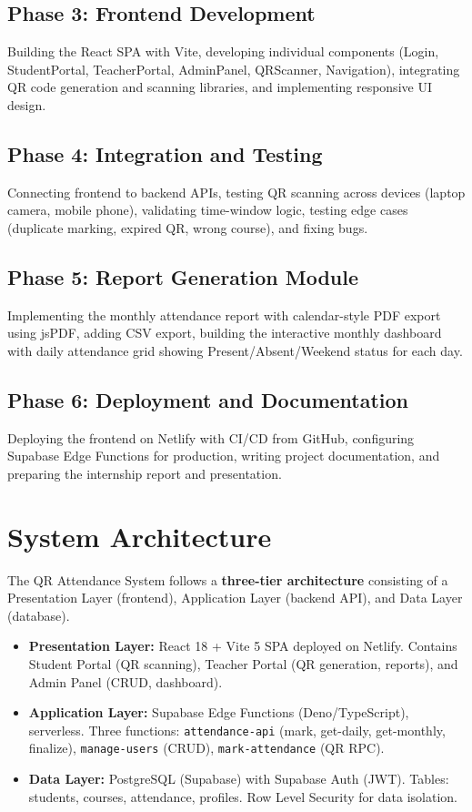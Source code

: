 \documentclass{SOICTthesis}
\begin{document}
\subsection{Phase 3: Frontend Development}
Building the React SPA with Vite, developing individual components (Login, StudentPortal, TeacherPortal, AdminPanel, QRScanner, Navigation), integrating QR code generation and scanning libraries, and implementing responsive UI design.

\subsection{Phase 4: Integration and Testing}
Connecting frontend to backend APIs, testing QR scanning across devices (laptop camera, mobile phone), validating time-window logic, testing edge cases (duplicate marking, expired QR, wrong course), and fixing bugs.

\subsection{Phase 5: Report Generation Module}
Implementing the monthly attendance report with calendar-style PDF export using jsPDF, adding CSV export, building the interactive monthly dashboard with daily attendance grid showing Present/Absent/Weekend status for each day.

\subsection{Phase 6: Deployment and Documentation}
Deploying the frontend on Netlify with CI/CD from GitHub, configuring Supabase Edge Functions for production, writing project documentation, and preparing the internship report and presentation.

\section{System Architecture}
\label{sec:system_architecture}

The QR Attendance System follows a \textbf{three-tier architecture} consisting of a Presentation Layer (frontend), Application Layer (backend API), and Data Layer (database).

\begin{itemize}
    \item \textbf{Presentation Layer:} React 18 + Vite 5 SPA deployed on Netlify. Contains Student Portal (QR scanning), Teacher Portal (QR generation, reports), and Admin Panel (CRUD, dashboard).
    \item \textbf{Application Layer:} Supabase Edge Functions (Deno/TypeScript), serverless. Three functions: \texttt{attendance-api} (mark, get-daily, get-monthly, finalize), \texttt{manage-users} (CRUD), \texttt{mark-attendance} (QR RPC).
    \item \textbf{Data Layer:} PostgreSQL (Supabase) with Supabase Auth (JWT). Tables: students, courses, attendance, profiles. Row Level Security for data isolation.
\end{itemize}
\end{document}
